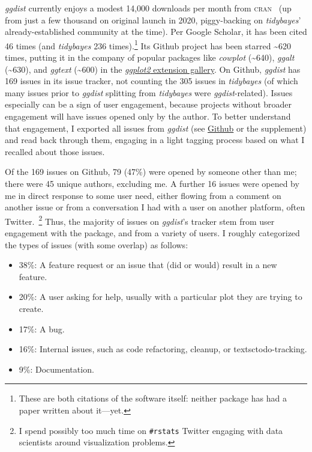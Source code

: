 \documentclass[journal]{vgtc}                     %
\begin{document}
\textit{ggdist} currently enjoys a modest 14,000 downloads per month from \textsc{cran}~\cite{csardi2019cranlogs} (up from just a few thousand on original launch in 2020, piggy-backing on \textit{tidybayes}' already-established community at the time). Per Google Scholar, it has been cited 46 times (and \textit{tidybayes} 236 times).\footnote{These are both citations of the software itself: neither package has had a paper written about it---yet.} Its Github project has been starred \textasciitilde 620 times, putting it in the company of popular packages like \textit{cowplot} (\textasciitilde 640), \textit{ggalt} (\textasciitilde 630), and \textit{ggtext} (\textasciitilde 600) in the \href{https://exts.ggplot2.tidyverse.org/gallery/}{\textit{ggplot2} extension gallery}. On Github, \textit{ggdist} has 169 issues in its issue tracker, not counting the 305 issues in \textit{tidybayes} (of which many issues prior to \textit{ggdist} splitting from \textit{tidybayes }were \textit{ggdist}-related). Issues especially can be a sign of user engagement, because projects without broader engagement will have issues opened only by the author. To better understand that engagement, I exported all issues from \textit{ggdist} (see \href{https://github.com/mjskay/ggdist/issues}{Github} or the supplement) and read back through them, engaging in a light tagging process based on what I recalled about those issues.

Of the 169 issues on Github, 79 (47\%) were opened by someone other than me; there were 45 unique authors, excluding me. A further 16 issues were opened by me in direct response to some user need, either flowing from a comment on another issue or from a conversation I had with a user on another platform, often Twitter.~\footnote{I spend possibly too much time on \texttt{\#rstats} Twitter engaging with data scientists around visualization problems.} Thus, the majority of issues on \textit{ggdist}'s tracker stem from user engagement with the package, and from a variety of users. I roughly categorized the types of issues (with some overlap) as follows:

\begin{itemize}
    \item 38\%: A feature request or an issue that (did or would) result in a new feature.
    \item 20\%: A user asking for help, usually with a particular plot they are trying to create.
    \item 17\%: A bug.
    \item 16\%: Internal issues, such as code refactoring, cleanup, or textsc{todo}-tracking.
    \item 9\%: Documentation.
\end{itemize}
\end{document}
